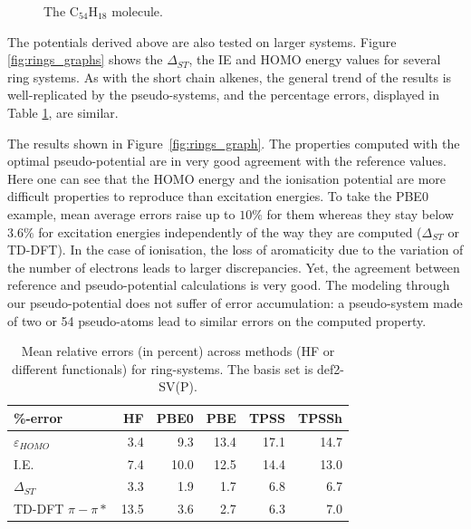 \documentclass[aip]{revtex4-1}
\begin{document}
\begin{figure}
\begin{center}
\end{center}
\caption{\label{fig:c54h18}The C\(_{54}\)H\(_{18}\) molecule.}
\end{figure}

The potentials derived above are also tested on larger systems.
Figure \ref{fig:rings_graphs} shows the $\Delta_{ST}$, the IE and
HOMO energy values for several ring systems.
As with the short chain alkenes, the general trend of the results is well-replicated
by the pseudo-systems, and the percentage errors, displayed in Table
\ref{table:ring_system_errors}, are similar.

The results shown in Figure~\ref{fig:rings_graph}.
The properties computed with the optimal pseudo-potential are in very good
agreement with the reference values.
Here one can see that the HOMO energy and the ionisation potential
are more difficult properties to reproduce than excitation energies.
To take the PBE0 example, mean average errors raise up to $10\%$ for them
whereas they stay below $3.6\%$ for excitation energies independently of the way they are computed
($\Delta_{ST}$ or TD-DFT).
In the case of ionisation, the loss of aromaticity due to the variation of the number of
electrons leads to larger discrepancies.
Yet, the agreement between reference and pseudo-potential calculations is very good.
The modeling through our pseudo-potential does not suffer of error accumulation: a pseudo-system
made of two or 54 pseudo-atoms lead to similar errors on the computed property.

\begin{table}[ht]
\caption{Mean relative errors (in percent) across methods (HF or different functionals)
for ring-systems.
The basis set is def2-SV(P).}
\begin{tabular}{l r r r r r }
\hline\hline
\%-error                & HF & PBE0 & PBE & TPSS & TPSSh \\
\hline
$\varepsilon_{HOMO}$    & 3.4 &  9.3  & 13.4 & 17.1 & 14.7 \\
I.E.                    & 7.4 & 10.0  & 12.5 & 14.4 & 13.0 \\
$\Delta_{ST}$           & 3.3 &  1.9  &  1.7 &  6.8 &  6.7 \\
TD-DFT $\pi-\pi*$       & 13.5 &  3.6  &  2.7 &  6.3 &  7.0 \\ 
\hline\hline
\end{tabular}
\label{table:ring_system_errors}
\end{table}
\end{document}
